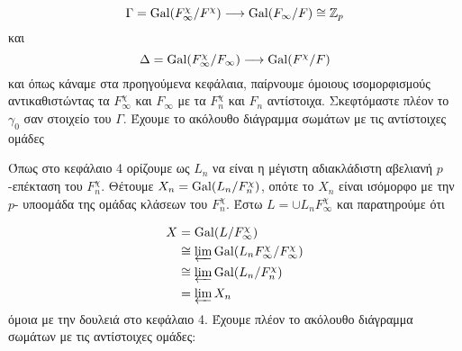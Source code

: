 $$\Gamma = \operatorname{Gal}(F^\chi_\infty/F^\chi) \longrightarrow \operatorname{Gal}(F_\infty/F)\cong \mathbb{Z}_p$$ και 
$$\Delta = \operatorname{Gal}(F^\chi_\infty/F_\infty) \longrightarrow \operatorname{Gal}(F^\chi/F)$$ και όπως κάναμε στα προηγούμενα κεφάλαια, παίρνουμε όμοιους ισομορφισμούς αντικαθιστώντας τα $F^\chi_\infty$ και $F_\infty$ με τα $F^\chi_n$ και $F_n$ αντίστοιχα. Σκεφτόμαστε πλέον το $\gamma_0$ σαν στοιχείο του $\Gamma$. Έχουμε το ακόλουθο διάγραμμα σωμάτων με τις αντίστοιχες ομάδες

\begin{figure}[H]
    \centering
\end{figure}


\noindent Όπως στο κεφάλαιο 4 ορίζουμε ως $L_n$ να είναι η μέγιστη αδιακλάδιστη αβελιανή $p$-επέκταση του $F^\chi_n$. Θέτουμε $X_n = \operatorname{Gal}(L_n/F^\chi_n)$, οπότε το $X_n$ είναι ισόμορφο με την $p$- υποομάδα της ομάδας κλάσεων του $F^\chi_n$. Έστω $L = \cup L_n F^\chi_\infty$ και παρατηρούμε ότι

\begin{align*}
    X &= \operatorname{Gal}(L/F^\chi_\infty) \\
    &\cong \varprojlim \operatorname{Gal}(L_nF^\chi_\infty/F^\chi_\infty) \\
    &\cong \varprojlim \operatorname{Gal}(L_n/F^\chi_n) \\ 
    &= \varprojlim X_n
\end{align*}
όμοια με την δουλειά στο κεφάλαιο 4. Έχουμε πλέον το ακόλουθο διάγραμμα σωμάτων με τις αντίστοιχες ομάδες:

